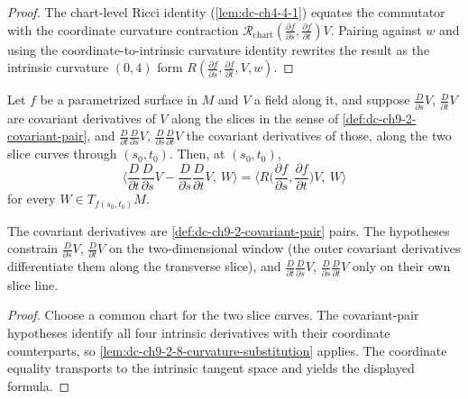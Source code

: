 \begin{proof}
  \leanok
  \sketch
  The chart-level Ricci identity (\cref{lem:dc-ch4-4-1}) equates the commutator with the
  coordinate curvature contraction $\mathcal{R}_{\mathrm{chart}}(\frac{\partial f}{\partial s},\frac{\partial f}{\partial t})V$.
  Pairing against $w$ and using the coordinate-to-intrinsic curvature identity rewrites
  the result as the intrinsic curvature $(0,4)$ form
  $R(\frac{\partial f}{\partial s},\frac{\partial f}{\partial t},V,w)$.
\end{proof}
\begin{lemma}
  \label{lem:dc-ch9-2-8-curvature-substitution-manifold}
  \leanok
  Let $f$ be a parametrized surface in $M$ and $V$ a field along it, and suppose
  $\frac{D}{\partial s}V$, $\frac{D}{\partial t}V$ are covariant derivatives of $V$ along the
  slices in the sense of \cref{def:dc-ch9-2-covariant-pair}, and
  $\frac{D}{\partial t}\frac{D}{\partial s}V$, $\frac{D}{\partial s}\frac{D}{\partial t}V$ the
  covariant derivatives of those, along the two slice curves through $(s_0,t_0)$. Then, at
  $(s_0,t_0)$,
  $$
  \Big\langle\frac{D}{\partial t}\frac{D}{\partial s}V - \frac{D}{\partial s}\frac{D}{\partial t}V,\ W\Big\rangle
    = \Big\langle R\Big(\frac{\partial f}{\partial s},\frac{\partial f}{\partial t}\Big)V,\ W\Big\rangle
  $$
  for every $W\in T_{f(s_0,t_0)}M$.

  The covariant derivatives are \cref{def:dc-ch9-2-covariant-pair} pairs. The hypotheses
  constrain $\frac{D}{\partial s}V$, $\frac{D}{\partial t}V$ on the two-dimensional window
  (the outer covariant derivatives differentiate them along the transverse slice), and
  $\frac{D}{\partial t}\frac{D}{\partial s}V$, $\frac{D}{\partial s}\frac{D}{\partial t}V$ only
  on their own slice line.
\end{lemma}
\begin{proof}
  \leanok
  \sketch
  Choose a common chart for the two slice curves. The covariant-pair hypotheses
  identify all four intrinsic derivatives with their coordinate counterparts, so
  \cref{lem:dc-ch9-2-8-curvature-substitution} applies. The coordinate equality
  transports to the intrinsic tangent space and yields the displayed formula.
\end{proof}
